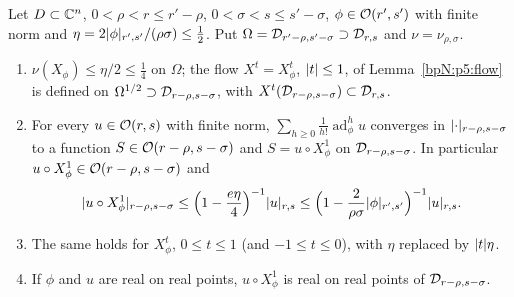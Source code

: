 \begin{theorem}\label{bpN:p5:composition}
Let $D\subset\mathbb{C}^n$, $0<\rho<r\le r'-\rho$, $0<\sigma<s\le s'-\sigma$, $\phi\in\mathcal O(r',s')$ with finite norm and $\eta=2\lvert \phi\rvert_{r',s'}/(\rho\sigma)\le\frac12$. Put $\Omega=\mathcal D_{r'-\rho,s'-\sigma}\supset\mathcal D_{r,s}$ and $\nu=\nu_{\rho,\sigma}$.
\begin{enumerate}[label=(\roman*)]
\item $\nu(X_\phi)\le\eta/2\le\frac14$ on $\Omega$; the flow $X^t=X_\phi^t$, $\lvert t\rvert\le1$, of Lemma~\ref{bpN:p5:flow} is defined on $\Omega^{1/2}\supset\mathcal D_{r-\rho,s-\sigma}$, with $X^t(\mathcal D_{r-\rho,s-\sigma})\subset\mathcal D_{r,s}$.
\item For every $u\in\mathcal O(r,s)$ with finite norm, $\sum_{h\ge0}\frac1{h!}\operatorname{ad}^h_\phi u$ converges in $\lvert \cdot\rvert_{r-\rho,s-\sigma}$ to a function $S\in\mathcal O(r-\rho,s-\sigma)$ and
 $S=u\circ X^1_\phi$ on $\mathcal D_{r-\rho,s-\sigma}$. In particular $u\circ X^1_\phi\in\mathcal O(r-\rho,s-\sigma)$ and
\[\lvert u\circ X_\phi^1\rvert_{r-\rho,s-\sigma}\le\Bigl(1-\frac{e\eta}4\Bigr)^{-1}\lvert u\rvert_{r,s}\le\Bigl(1-\frac2{\rho\sigma}\lvert \phi\rvert_{r',s'}\Bigr)^{-1}\lvert u\rvert_{r,s}.\]
\item The same holds for $X^t_\phi$, $0\le t\le1$ (and $-1\le t\le0$), with $\eta$ replaced by $\lvert t\rvert\eta$.
\item If $\phi$ and $u$ are real on real points, $u\circ X^1_\phi$ is real on real points of $\mathcal D_{r-\rho,s-\sigma}$.
\end{enumerate}
\end{theorem}
